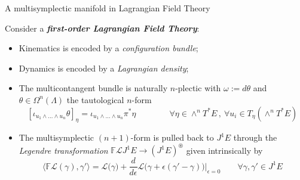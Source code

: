 \documentclass[10pt]{beamer}
\begin{document}
\begin{frame}[fragile]{A multisymplectic manifold in Lagrangian Field Theory}\label{frame:GIMMSY_construction}
	\begin{center}
		
	\end{center}	
	\vfill
	
	Consider a \emph{\bf{first-order Lagrangian Field Theory}}:
	\begin{itemize}
		\item<1-> {\color{blue} Kinematics} is encoded by a {\color{blue} \emph{configuration bundle}};
		\item<2-> {\color{red} Dynamics} is encoded by a {\color{red} \emph{Lagrangian density}};
		\item<3-> The {\color{orange} multicontangent bundle} is naturally $n$-plectic with $\omega := d \theta$ and \\
		$\theta \in \Omega^n(\Lambda)$ the tautological $n$-form
		{\small
		\begin{displaymath}
			\left[ \iota_{u_1 \wedge \ldots \wedge u_n} \theta \right]_\eta 
			= \iota_{u_1 \wedge \ldots \wedge u_n} \pi^\ast \eta 
			\qquad \qquad \forall \eta \in \wedge^n T^* E \, , \: \forall u_i \in T_\eta (\wedge^n T^* E) 		
		\end{displaymath}
		}
		\item<4-> The multisymplectic $(n+1)$-form is pulled back to $J^1 E$ through the \emph{Legendre transformation} $\mathbb{F}\mathcal{L} J^1 E \to (J^1 E)^\circledast$
    given intrinsically by
    {\small
		\begin{displaymath}
        		\Big\langle \mathbb{F}\mathcal{L}(\gamma),\gamma'\Big\rangle=
        		\mathcal{L}\Big(\gamma\Big) + \frac{ d}{ d \epsilon}\mathcal{L}\Big(\gamma +\epsilon(\gamma'-\gamma)\Big)\Bigg\vert_{\epsilon=0} \qquad \forall \gamma,\gamma' \in J^1 E
    		\end{displaymath}
    }

	\end{itemize}
	\vfill
	\hfill {}%
\end{frame}


\end{document}

